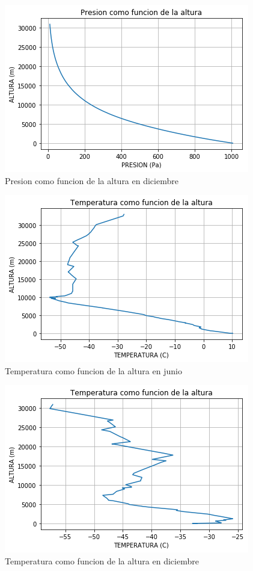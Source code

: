 \documentclass{article}
\begin{document}
\begin{figure}[h]
  \centering
  \includegraphics[scale=0.5]{presiond.png}
  \caption{Presion como funcion de la altura en diciembre}
\end{figure}


\begin{figure}[h]
  \centering
  \includegraphics[scale=0.5]{tempj.png}
  \caption{Temperatura como funcion de la altura en junio }
\end{figure}

\begin{figure}
  \centering
  \includegraphics[scale=0.5]{tempd.png}
  \caption{Temperatura como funcion de la altura en diciembre }
\end{figure}
\end{document}
